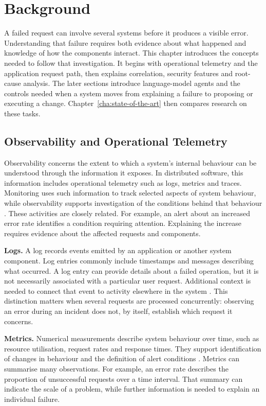 \chapter{Background}
\label{cha:background}


A failed request can involve several systems before it produces a visible
error. Understanding that failure requires both evidence about what
happened and knowledge of how the components interact. This chapter
introduces the concepts needed to follow that investigation. It begins with
operational telemetry and the application request path, then explains
correlation, security features and root-cause analysis. The later sections
introduce language-model agents and the controls needed when a system moves
from explaining a failure to proposing or executing a change. Chapter~\ref{cha:state-of-the-art}
then compares research on these tasks.

\section{Observability and Operational Telemetry}
\label{sec:background:observability}

Observability concerns the extent to which a system's internal behaviour can
be understood through the information it exposes. In distributed software,
this information includes operational telemetry such as logs, metrics and
traces. Monitoring uses such information to track selected aspects of system
behaviour, while observability supports investigation of the conditions
behind that behaviour \parencite{usman2022observability}. These activities
are closely related. For example, an alert about an increased error rate
identifies a condition requiring attention. Explaining the increase requires
evidence about the affected requests and components.

\noindent\textbf{Logs.} A log records events emitted by an application or
another system component. Log entries commonly include timestamps and
messages describing what occurred. A log entry can provide details about a failed operation, but
it is not necessarily associated with a particular user request. Additional
context is needed to connect that event to activity elsewhere in the system
\parencite{opentelemetry2026observability}. This distinction matters when
several requests are processed concurrently: observing an error during an
incident does not, by itself, establish which request it concerns.

\noindent\textbf{Metrics.} Numerical measurements describe system behaviour
over time, such as resource utilisation, request rates and response times.
They support
identification of changes in behaviour and the definition of alert conditions
\parencite{usman2022observability}. Metrics can summarise many observations.
For example, an error rate describes the proportion of unsuccessful requests
over a time interval. That summary can indicate the scale of a problem, while
further information is needed to explain an individual failure.


